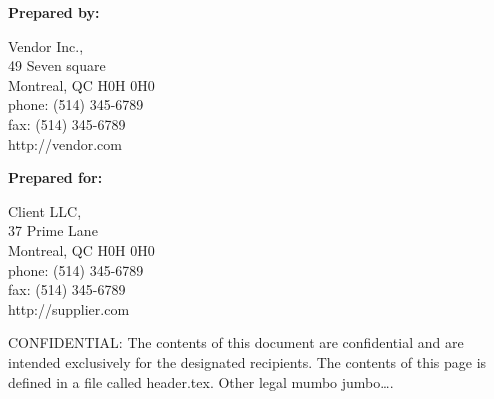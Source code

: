 \begin{titlingpage}
  \maketitle
  \vfill
\end{titlingpage}

\pagebreak

\thispagestyle{empty}

\textbf{Prepared by:}

Vendor Inc.,\\49 Seven square\\Montreal, QC H0H 0H0\\phone: (514)
345-6789\\fax: (514) 345-6789\\http://vendor.com

\textbf{}

\textbf{Prepared for:}

Client LLC,\\37 Prime Lane\\Montreal, QC H0H 0H0\\phone: (514)
345-6789\\fax: (514) 345-6789\\http://supplier.com

\vfill

CONFIDENTIAL: The contents of this document are confidential and are
intended exclusively for the designated recipients. The contents of this page
is defined in a file called header.tex. Other legal mumbo jumbo\ldots{}.

\pagebreak
